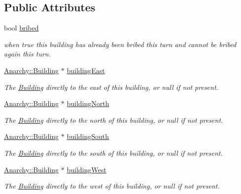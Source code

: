 \subsection*{Public Attributes}
\begin{DoxyCompactItemize}
\item 
bool \hyperlink{classAnarchy_1_1Building_a2d0079a53d7239ad72be834a168a29a4}{bribed}
\begin{DoxyCompactList}\small\item\em when true this building has already been bribed this turn and cannot be bribed again this turn. \end{DoxyCompactList}\item 
\hyperlink{classAnarchy_1_1Building}{Anarchy\-::\-Building} $\ast$ \hyperlink{classAnarchy_1_1Building_aeecf09082fb73c6b6df35fda22431d79}{building\-East}
\begin{DoxyCompactList}\small\item\em The \hyperlink{classAnarchy_1_1Building}{Building} directly to the east of this building, or null if not present. \end{DoxyCompactList}\item 
\hyperlink{classAnarchy_1_1Building}{Anarchy\-::\-Building} $\ast$ \hyperlink{classAnarchy_1_1Building_aeed7b639ac2199c247d6b168a789acfc}{building\-North}
\begin{DoxyCompactList}\small\item\em The \hyperlink{classAnarchy_1_1Building}{Building} directly to the north of this building, or null if not present. \end{DoxyCompactList}\item 
\hyperlink{classAnarchy_1_1Building}{Anarchy\-::\-Building} $\ast$ \hyperlink{classAnarchy_1_1Building_a12a304929ca4c48f717035b535078c46}{building\-South}
\begin{DoxyCompactList}\small\item\em The \hyperlink{classAnarchy_1_1Building}{Building} directly to the south of this building, or null if not present. \end{DoxyCompactList}\item 
\hyperlink{classAnarchy_1_1Building}{Anarchy\-::\-Building} $\ast$ \hyperlink{classAnarchy_1_1Building_accc6c555aa5cd0e02e88dc727e5fcd79}{building\-West}
\begin{DoxyCompactList}\small\item\em The \hyperlink{classAnarchy_1_1Building}{Building} directly to the west of this building, or null if not present. \end{DoxyCompactList}\item 

\end{DoxyCompactItemize}
